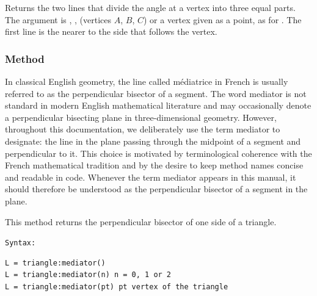 Returns the two lines that divide the angle at a vertex into three equal parts.
The argument  is , ,  (vertices $A$, $B$, $C$)
or a vertex given as a point, as for .
The first line is the nearer to the side that follows the vertex.

\begin{tkzexample}[latex=.5\textwidth]
\begin{center}
\end{center}
\end{tkzexample}

\subsubsection{Method }
\label{ssub:triangle_mediator}
In classical English geometry, the line called médiatrice in French is usually referred to as the perpendicular bisector of a segment.
The word mediator is not standard in modern English mathematical literature and may occasionally denote a perpendicular bisecting plane in three-dimensional geometry.
However, throughout this documentation, we deliberately use the term mediator to designate:
the line in the plane passing through the midpoint of a segment and perpendicular to it.
This choice is motivated by terminological coherence with the French mathematical tradition and by the desire to keep method names concise and readable in code.
Whenever the term mediator appears in this manual, it should therefore be understood as the perpendicular bisector of a segment in the plane.


This method returns the perpendicular bisector of one side of a triangle.

\texttt{Syntax: }

\begin{verbatim}
L = triangle:mediator()
L = triangle:mediator(n) n = 0, 1 or 2
L = triangle:mediator(pt) pt vertex of the triangle
\end{verbatim}

